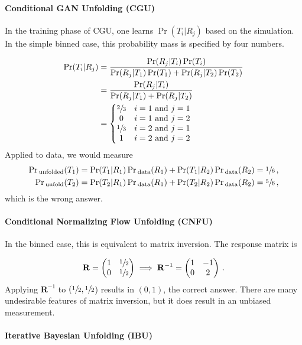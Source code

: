 \paragraph{Conditional GAN Unfolding (CGU)} In the training phase of CGU, one learns $\Pr(T_i|R_j)$ based on the simulation.  In the simple binned case, this probability mass is specified by four numbers.

\begin{align}
\Pr(T_i|R_j)&=\frac{\Pr(R_j|T_i)\Pr(T_i)}{\Pr(R_j|T_1)\Pr(T_1)+\Pr(R_j|T_2)\Pr(T_2)}\\
&=\frac{\Pr(R_j|T_i)}{\Pr(R_j|T_1)+\Pr(R_j|T_2)}\\
&=\left\{\begin{matrix}\sfrac{2}{3} & \text{$i=1$ and $j=1$} \cr 0 & \text{$i=1$ and $j=2$}  \cr \sfrac{1}{3}& \text{$i=2$ and $j=1$}  \cr 1& \text{$i=2$ and $j=2$}  \end{matrix}\right.
\end{align}
%
Applied to data, we would measure
%
\begin{align}
\Pr{}_\text{unfolded}(T_1)&=\Pr(T_1|R_1)\Pr{}_\text{data}(R_1)+\Pr(T_1|R_2)\Pr{}_\text{data}(R_2)=\sfrac{1}{6}\,,\\
\Pr{}_\text{unfold}(T_2)&=\Pr(T_2|R_1)\Pr{}_\text{data}(R_1)+\Pr(T_2|R_2)\Pr{}_\text{data}(R_2)=\sfrac{5}{6}\,,
\end{align}
%
which is the wrong answer.

\paragraph{Conditional Normalizing Flow Unfolding (CNFU)} In the binned case, this is equivalent to matrix inversion.   The response matrix is

\begin{align}
\mathbf{R}=\begin{pmatrix} 1& \sfrac{1}{2}\cr 0 & \sfrac{1}{2}\end{pmatrix}\implies \mathbf{R}^{-1}=\begin{pmatrix} 1 & -1 \cr 0 & 2\end{pmatrix}\,.
\end{align}
%
Applying $\mathbf{R}^{-1}$ to $(\sfrac{1}{2},\sfrac{1}{2}$) results in $(0,1)$, the correct answer.  There are many undesirable features of matrix inversion, but it does result in an unbiased measurement.

\paragraph{Iterative Bayesian Unfolding (IBU)}

